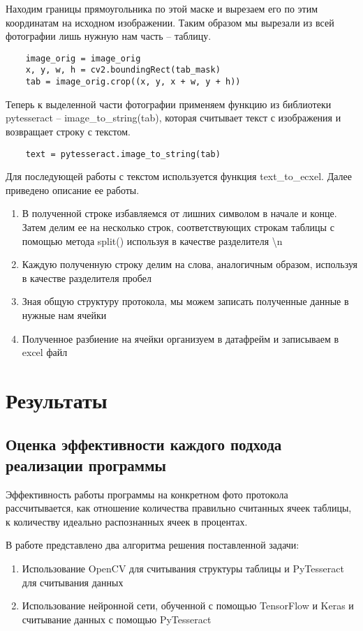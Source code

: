 \documentclass[a4paper, 12pt]{report}
\begin{document}
Находим границы прямоугольника по этой маске и вырезаем его по этим координатам на исходном изображении. Таким образом мы вырезали из всей фотографии лишь нужную нам часть – таблицу.
\begin{lstlisting}
    image_orig = image_orig
    x, y, w, h = cv2.boundingRect(tab_mask)
    tab = image_orig.crop((x, y, x + w, y + h))
\end{lstlisting}

Теперь к выделенной части фотографии применяем функцию из библиотеки pytesseract – image\_to\_string(tab), которая считывает текст с изображения и возвращает строку с текстом.

\begin{lstlisting}
    text = pytesseract.image_to_string(tab)
\end{lstlisting}

Для последующей работы с текстом используется функция text\_to\_ecxel. Далее приведено описание ее работы.

\begin{enumerate}
    \item В полученной строке избавляемся от лишних символом в начале и конце. Затем делим ее на несколько строк, соответствующих строкам таблицы с помощью метода split() используя в качестве разделителя \textbackslash n
    \item Каждую полученную строку делим на слова, аналогичным образом, используя в качестве разделителя пробел
    \item Зная общую структуру протокола, мы можем записать полученные данные в нужные нам ячейки
    \item Полученное разбиение на ячейки организуем в датафрейм и записываем в excel файл
\end{enumerate}

\chapter{Результаты}

\section{Оценка эффективности каждого подхода реализации программы}
Эффективность работы программы на конкретном фото протокола рассчитывается, как отношение количества правильно считанных ячеек таблицы, к количеству идеально распознанных ячеек в процентах.

В работе представлено два алгоритма решения поставленной задачи:
\begin{enumerate}
    \item Использование OpenCV для считывания структуры таблицы и PyTesseract для считывания данных
    \item Использование нейронной сети, обученной с помощью TensorFlow и Keras и считывание данных с помощью PyTesseract
\end{enumerate}
\end{document}
